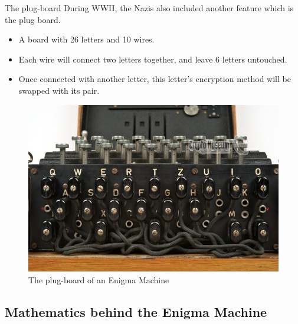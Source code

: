 \documentclass{beamer}
\begin{document}
\begin{frame}{The plug-board}
During WWII, the Nazis also included another feature which is the plug board.
\begin{itemize}
    \item A board with 26 letters and 10 wires.
    \item Each wire will connect two letters together, and leave 6 letters untouched.
    \item Once connected with another letter, this letter's encryption method will be swapped with its pair. 
\end{itemize}
\begin{figure}
\includegraphics[scale=0.2]{plug board.jpeg}
\caption{The plug-board of an Enigma Machine}
\end{figure}
\end{frame}



\subsection{Mathematics behind the Enigma Machine}
\end{document}
